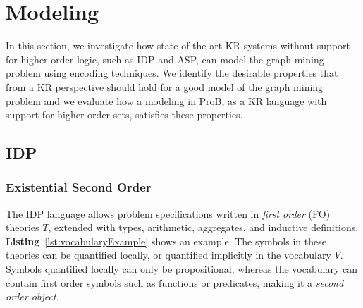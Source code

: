\section{Modeling}\label{sec:modeling}
In this section, we investigate how state-of-the-art KR systems without support for higher order logic, such as IDP and ASP, can model the graph mining problem 
using encoding techniques.
We identify the desirable properties that from a KR perspective should hold for a good model of the graph mining problem and we evaluate how a modeling in ProB, as a KR language with support for higher order sets, satisfies these properties.

\subsection{IDP}
\subsubsection{Existential Second Order}
The IDP language allows problem specifications written in \emph{first order} (FO) theories $T$, extended with types, arithmetic, aggregates, and inductive definitions.
\textbf{Listing}~\ref{lst:vocabularyExample} shows an example.
The symbols in these theories can be quantified locally, or quantified implicitly in the vocabulary $V$.
Symbols quantified locally can only be propositional, whereas the vocabulary can contain first order symbols such as functions or predicates, making it a \emph{second order object}.

